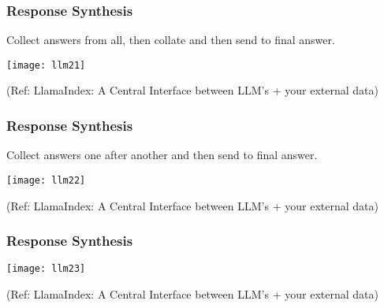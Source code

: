 \begin{frame}[fragile]\frametitle{Response Synthesis}

Collect answers from all, then collate and then send to final answer.

\begin{center}
\texttt{[image: llm21]}

{\tiny (Ref: LlamaIndex: A Central Interface between LLM's + your external data)}
\end{center}
\end{frame}

\begin{frame}[fragile]\frametitle{Response Synthesis}

Collect answers one after another and then send to final answer.

\begin{center}
\texttt{[image: llm22]}

{\tiny (Ref: LlamaIndex: A Central Interface between LLM's + your external data)}
\end{center}
\end{frame}








\begin{frame}[fragile]\frametitle{Response Synthesis}

\begin{center}
\texttt{[image: llm23]}

{\tiny (Ref: LlamaIndex: A Central Interface between LLM's + your external data)}
\end{center}
\end{frame}

